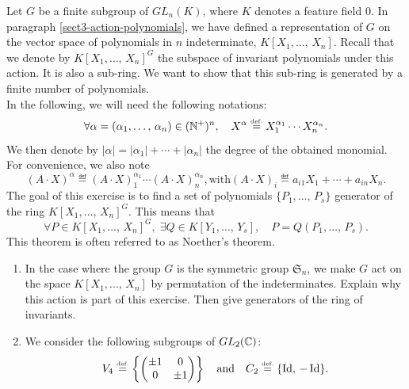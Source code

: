  
\begin{exo}
\label{exo-action-polynomials}
 
   Let $G$ be a finite subgroup of $ GL_n (K) $, where $K$ denotes a feature field $ 0 $. In paragraph \ref{sect3-action-polynomials}, we have defined a representation of $G$ on the vector space of polynomials in $ n $ indeterminate, $ K[X_1, \ldots, \, X_n] $. Recall that we denote by $ K[X_1, \ldots, \, X_n]^G $ the subspace of invariant polynomials under this action. It is also a sub-ring. We want to show that this sub-ring is generated by a finite number of polynomials. \\In the following, we will need the following notations:
\begin{equation*}
\forall \alpha = (\alpha_1, \ldots, \, \alpha_n) \in (\mathbb{N}^+)^n, \quad X^\alpha \stackrel{\mbox{\upshape\tiny def.}}{=} X_1^{\alpha_1} \cdots X_n^{\alpha_n} .
\end{equation*}
We then denote by $ | \alpha | = | \alpha_1 | + \cdots + | \alpha_n | $ the degree of the obtained monomial. For convenience, we also note
\begin{equation*}
(A \cdot X)^\alpha \eqdef(A \cdot X)_1^{\alpha_1} \cdots (A \cdot X)_n^{\alpha_n}, \text{with} (A \cdot X)_i \eqdef a_{i1} X_1 + \cdots + a_{in} X_n.
\end{equation*}
The goal of this exercise is to find a set of polynomials $ \{P_1, \ldots, \, P_s\} $ generator of the ring $ K[X_1, \ldots, \, X_n]^G $. This means that
\begin{equation}
\label{eq-defn-generation-ring-invariants}
\forall P \in K[X_1, \ldots, \, X_n]^G, \; \exists Q \in K[Y_1, \ldots, \, Y_s], \quad P = Q (P_1, \ldots, \, P_s).
\end{equation}
This theorem is often referred to as Noether's theorem. \begin{enumerate}
\item {} In the case where the group $G$ is the symmetric group $ \mathfrak{S}_n $, we make $G$ act on the space $ K[X_1, \ldots, \, X_n] $ by permutation of the indeterminates. Explain why this action is part of this exercise. Then give generators of the ring of invariants.
\item {} We consider the following subgroups of $ GL_2 (\mathbb{C}) $:
\begin{equation*}
V_4 \eqdef \left\{\begin{pmatrix} \pm 1 & 0 \\0 & \pm 1 \end{pmatrix} \right\} \quad \text{and} \quad C_2 \eqdef \{\Id, \, - \Id\}.

\end{equation*}
\end{enumerate}
\end{exo}
